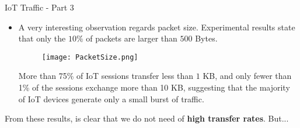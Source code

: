 \documentclass[13.5pt]{beamer}
\begin{document}
\begin{frame}{IoT Traffic - Part 3}

\begin{itemize}
\justifying
\item A very interesting observation regards packet size. Experimental results state that only the $10\%$ of packets are larger than $500$ Bytes.



\begin{figure}
  \texttt{[image: PacketSize.png]}
\end{figure}

\begin{quoting}[font=itshape, begintext={``}, endtext={''\\\textbf{\citet{ITPAReport}}}]
\justifying
More than 75\% of IoT sessions transfer less than $1$ KB, and only fewer than 1\% of the sessions exchange
more than 10 KB, suggesting that the majority of IoT devices generate only a small burst of traffic.
\end{quoting}

\end{itemize}

\begin{alertblock}{}
\justifying
From these results, is clear that we do not need of \textbf{high transfer rates}. But...
\end{alertblock}

\end{frame} 
\end{document}
